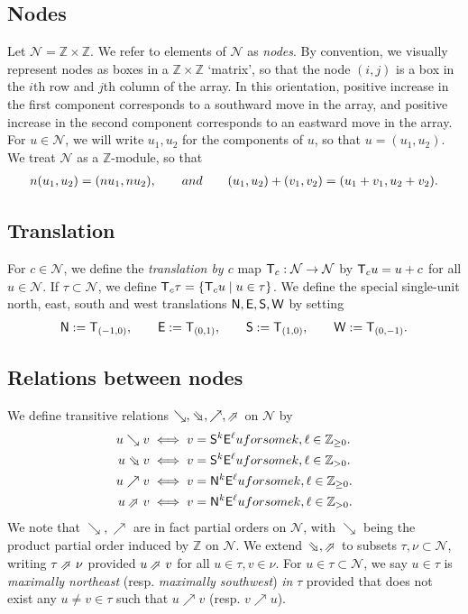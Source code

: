 \documentclass[Unicode,ALCO]{cedram}
\newcommand{\Z}{\mathbb{Z}}
\newcommand{\N}{\mathcal{N}}
\newcommand{\0}{{\bar 0}}
\newcommand{\NEarrow}{\mathbin{\rotatebox[origin=c]{45}{$\Rightarrow$}}}
\newcommand{\SEarrow}{\mathbin{\rotatebox[origin=c]{-45}{$\Rightarrow$}}}
\newcommand{\ZZ}{{\mathbb Z}}
\newcommand{\so}{{\sf S}}
\newcommand{\no}{{\sf N}}
\newcommand{\ea}{{\sf E}}
\newcommand{\we}{{\sf W}}
\newcommand{\T}{{\sf T}}
\begin{document}
\subsection{Nodes}
Let \(\N = \Z \times \Z\). We refer to elements of \(\N\) as {\em nodes}. By convention, we visually represent nodes as boxes in a \(\Z \times \Z\) `matrix', so that the node \((i,j)\) is a box in the \(i\)th row and \(j\)th column of the array. In this orientation, positive increase in the first component corresponds to a southward move in the array, and positive increase in the second component corresponds to an eastward move in the array. For \(u \in \N\), we will write \(u_1, u_2\) for the components of \(u\), so that \(u = (u_1, u_2)\). We treat \(\N\) as a \(\ZZ\)-module, so that
\begin{align*}
n(u_1, u_2) = (nu_1, nu_2), \qquad \textup{ and } \qquad (u_1,u_2) +(v_1, v_2) = (u_1 + v_1, u_2 + v_2).
\end{align*}






\subsection{Translation}
For \(c \in \N\), we define the {\em translation by \(c\)} map \(\T_c:\N \to \N\) by \(\T_cu = 
u+ c\) for all \(u \in \N\). If \(\tau \subset \N\), we define \(\T_c \tau = \{\T_c u \mid u \in \tau\}\).
We define the special single-unit north, east, south and west translations \(\no, \ea, \so, \we\) by setting 
\begin{align*}
\no := \T_{(-1,0)},\qquad \ea := \T_{(0,1)},\qquad \so := \T_{(1,0)},\qquad \we  := \T_{(0,-1)}.
\end{align*}


\subsection{Relations between nodes}
We define transitive relations \(\searrow, \SEarrow, \nearrow, \NEarrow\) on \(\N\) by
\begin{align*}
u \searrow v &\iff v = \so^k \ea^\ell u \textup{ for some }k,\ell \in \ZZ_{\geq 0}.\\
u \SEarrow v &\iff v = \so^k \ea^\ell u \textup{ for some }k,\ell \in \ZZ_{> 0}.\\
u \nearrow v &\iff v = \no^k \ea^\ell u \textup{ for some }k,\ell \in \ZZ_{\geq 0}.\\
u \NEarrow v &\iff v = \no^k \ea^\ell u \textup{ for some }k,\ell \in \ZZ_{> 0}.
\end{align*}
We note that \(\searrow, \nearrow\) are in fact partial orders on \(\N\), with \(\searrow\) being the product partial order induced by \(\ZZ\) on \(\N\). 
We extend \(\SEarrow, \NEarrow\) to subsets \(\tau, \nu \subset \N\), writing \(\tau \NEarrow \nu\) provided \(u \NEarrow v\) for all \(u \in \tau, v \in \nu\). 
For \(u \in \tau\subset \N\), we say \(u \in \tau\) is {\em maximally northeast} (resp. {\em maximally southwest}) {\em in} \(\tau\) provided that does not exist any \(u \neq v \in \tau\) such that \(u \nearrow v\) (resp. \(v \nearrow u\)).
\end{document}

